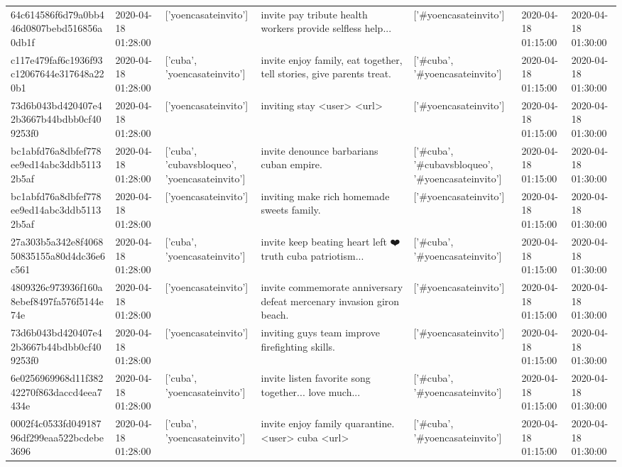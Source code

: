 \begin{tabular}{lllllll}
64c614586f6d79a0bb446d0807bebd516856a0db1f & 2020-04-18 01:28:00 & ['yoencasateinvito'] & invite pay tribute health workers provide selfless help... & ['#yoencasateinvito'] & 2020-04-18 01:15:00 & 2020-04-18 01:30:00 \\
c117e479faf6c1936f93c12067644e317648a220b1 & 2020-04-18 01:28:00 & ['cuba', 'yoencasateinvito'] & invite enjoy family, eat together, tell stories, give parents treat. & ['#cuba', '#yoencasateinvito'] & 2020-04-18 01:15:00 & 2020-04-18 01:30:00 \\
73d6b043bd420407e42b3667b44bdbb0cf409253f0 & 2020-04-18 01:28:00 & ['yoencasateinvito'] & inviting stay <user> <url> & ['#yoencasateinvito'] & 2020-04-18 01:15:00 & 2020-04-18 01:30:00 \\
bc1abfd76a8dbfef778ee9ed14abc3ddb51132b5af & 2020-04-18 01:28:00 & ['cuba', 'cubavsbloqueo', 'yoencasateinvito'] & invite denounce barbarians cuban empire. & ['#cuba', '#cubavsbloqueo', '#yoencasateinvito'] & 2020-04-18 01:15:00 & 2020-04-18 01:30:00 \\
bc1abfd76a8dbfef778ee9ed14abc3ddb51132b5af & 2020-04-18 01:28:00 & ['yoencasateinvito'] & inviting make rich homemade sweets family. & ['#yoencasateinvito'] & 2020-04-18 01:15:00 & 2020-04-18 01:30:00 \\
27a303b5a342e8f406850835155a80d4dc36e6c561 & 2020-04-18 01:28:00 & ['cuba', 'yoencasateinvito'] & invite keep beating heart left ❤️ truth cuba patriotism... & ['#cuba', '#yoencasateinvito'] & 2020-04-18 01:15:00 & 2020-04-18 01:30:00 \\
4809326c973936f160a8ebef8497fa576f5144e74e & 2020-04-18 01:28:00 & ['yoencasateinvito'] & invite commemorate anniversary defeat mercenary invasion giron beach. & ['#yoencasateinvito'] & 2020-04-18 01:15:00 & 2020-04-18 01:30:00 \\
73d6b043bd420407e42b3667b44bdbb0cf409253f0 & 2020-04-18 01:28:00 & ['yoencasateinvito'] & inviting guys team improve firefighting skills. & ['#yoencasateinvito'] & 2020-04-18 01:15:00 & 2020-04-18 01:30:00 \\
6e0256969968d11f38242270f863daccd4eea7434e & 2020-04-18 01:28:00 & ['cuba', 'yoencasateinvito'] & invite listen favorite song together... love much... & ['#cuba', '#yoencasateinvito'] & 2020-04-18 01:15:00 & 2020-04-18 01:30:00 \\
0002f4c0533fd04918796df299eaa522bcdebe3696 & 2020-04-18 01:28:00 & ['cuba', 'yoencasateinvito'] & invite enjoy family quarantine. <user> cuba <url> & ['#cuba', '#yoencasateinvito'] & 2020-04-18 01:15:00 & 2020-04-18 01:30:00 \\

\end{tabular}
